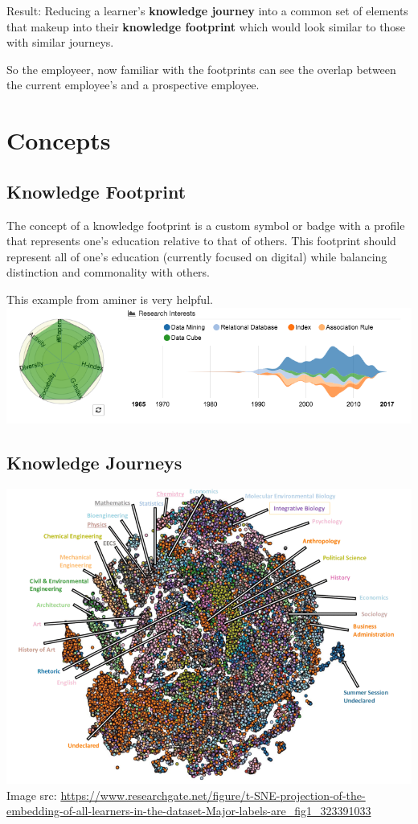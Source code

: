\documentclass[]{book}
\theoremstyle{definition}
\theoremstyle{definition}
\theoremstyle{definition}
\theoremstyle{remark}
\begin{document}
Result: Reducing a learner's \textbf{knowledge journey} into a common
set of elements that makeup into their \textbf{knowledge footprint}
which would look similar to those with similar journeys.

So the employeer, now familiar with the footprints can see the overlap
between the current employee's and a prospective employee.

\chapter{Concepts}\label{concepts}

\section{Knowledge Footprint}\label{knowledge-footprint}

The concept of a knowledge footprint is a custom symbol or badge with a
profile that represents one's education relative to that of others. This
footprint should represent all of one's education (currently focused on
digital) while balancing distinction and commonality with others.

This example from aminer is very helpful.
\includegraphics{img/aminer.png}

\section{Knowledge Journeys}\label{knowledge-journeys}

\includegraphics{img/tsne.png} Image src:
\url{https://www.researchgate.net/figure/t-SNE-projection-of-the-embedding-of-all-learners-in-the-dataset-Major-labels-are_fig1_323391033}
\end{document}
